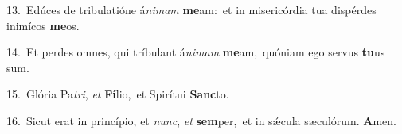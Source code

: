 {\numbfont\textcolor{\numbcolor}{13.}}~Edúces de tribulatióne á\-\textit{ni}\-\textit{mam} \textbf{me}\-am:~\star et in misericórdia tua dispérdes inimícos \textbf{me}\-os.\par
{\numbfont\textcolor{\numbcolor}{14.}}~Et perdes omnes, qui tríbulant á\-\textit{ni}\-\textit{mam} \textbf{me}\-am,~\star quóniam ego servus \textbf{tu}\-us sum.\par
{\numbfont\textcolor{\numbcolor}{15.}}~Glória Pa\-\textit{tri}\-, \textit{et} \textbf{Fí}\-lio,~\star et Spirítui \textbf{Sanc}\-to.\par
{\numbfont\textcolor{\numbcolor}{16.}}~Sicut erat in princípio, et \textit{nunc}\-, \textit{et} \textbf{sem}\-per,~\star et in sǽcula sæculórum. \textbf{A}\-men.\par
